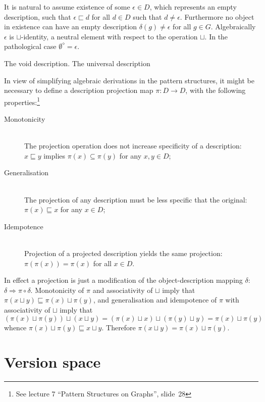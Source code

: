 \documentclass[a4paper]{article}
\newcommand{\brac}[1]{{\left ( #1 \right )}}
\begin{document}
It is natural to assume existence of some $\epsilon \in D$, which represents an empty description, such that $\epsilon \sqsubset d$ for all $d\in D$ such that $d\neq \epsilon$. Furthermore no object in existence can have an empty description $\delta(g)\neq \epsilon$ for all $g\in G$. Algebraically $\epsilon$ is $\sqcup$-identity, a neutral element with respect to the operation $\sqcup$. In the pathological case $\emptyset^\diamond=\epsilon$.

The void description. The universal description




In view of simplifying algebraic derivations in the pattern structures, it might be necessary to define a description projection map $\pi:D\to D$, with the following properties:\footnote{See lecture 7 ``Pattern Structures on Graphs'', slide~28} \begin{description}
	\item[Monotonicity] \hfill \\ The projection operation does not increase specificity of a description: $x\sqsubseteq y$ implies $\pi(x)\subseteq \pi(y)$ for any $x,y\in D$;
	\item[Generalisation] \hfill \\ The projection of any description must be less specific that the original: $\pi(x)\sqsubseteq x$ for any $x\in D$;
	\item[Idempotence] \hfill \\ Projection of a projected description yields the same projection: $\pi\brac{\pi(x)} = \pi(x)$ for all $x\in D$.
\end{description}
In effect a projection is just a modification of the object-description mapping $\delta$: $\delta \Rightarrow \pi \circ \delta$. Monotonicity of $\pi$ and associativity of $\sqcup$ imply that $\pi\brac{x\sqcup y}\sqsubseteq \pi(x)\sqcup\pi(y)$, and generalisation and idempotence of $\pi$ with associativity of $\sqcup$ imply that \[\brac{\pi(x)\sqcup\pi(y)}\sqcup (x\sqcup y) = \brac{\pi(x)\sqcup x}\sqcup \brac{\pi(y)\sqcup y} = \pi(x)\sqcup \pi(y)\] whence $\pi(x)\sqcup\pi(y)\sqsubseteq x\sqcup y$. Therefore $\pi\brac{x\sqcup y} = \pi(x)\sqcup\pi(y)$.



\section{Version space} %
\label{sec:version_space}
\end{document}
